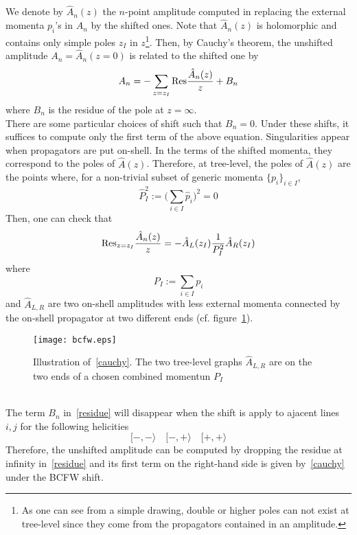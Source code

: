 \\\\
We denote by $\hat{A}_n(z)$ the $n$-point amplitude computed in replacing the external momenta $p_i$'s in $A_n$ by the shifted ones. 
Note that $\hat{A}_n(z)$ is holomorphic and contains only simple poles $z_I$ in $z$\footnote{As one can see from a simple drawing, double or higher poles can not exist at tree-level since they come from the propagators contained in an amplitude.}.
Then, by Cauchy's theorem, the unshifted amplitude $A_n = \hat{A}_n(z=0)$ is related to the shifted one by
\begin{equation}\label{residue}
A_n = - \sum_{z = z_I}\mathrm{Res}\frac{\hat{A}_n(z)}{z} + B_n
\end{equation} 
where $B_n$ is the residue of the pole at $z = \infty$.
\\
There are some particular choices of shift such that $B_n = 0$.
Under these shifts, it suffices to compute only the first term of the above equation. 
Singularities appear when propagators are put on-shell. 
In the terms of the shifted momenta, they correspond to the poles of $\hat{A}(z)$.
Therefore, at tree-level, the poles of $\hat{A}(z)$ are the points where, for a non-trivial subset of generic momenta $\{p_i\}_{i\in I}$, 
\begin{equation}
\hat{P}_I^2 := \big( \sum_{i\in I} \hat{p}_i \big)^2 = 0
\end{equation}   
%
Then, one can check that
\begin{equation}\label{cauchy}
\mathrm{Res}_{z=z_I}\frac{\hat{A}_n(z)}{z} = - \hat{A}_L(z_I)\frac{1}{P_I^2}\hat{A}_R(z_I)
\end{equation}
where 
\begin{equation}
P_I := \sum_{i\in I}p_i
\end{equation}
and $\hat{A}_{L,R}$ are two on-shell amplitudes with less external momenta connected by the on-shell propagator at two different ends (cf. figure~\ref{fig_cauchy}).
\begin{figure}[h]
  \centering
  \texttt{[image: bcfw.eps]}
  \caption{Illustration of~\cref{cauchy}. The two tree-level graphs $\hat{A}_{L,R}$ are on the two ends of a chosen combined momentun $P_I$}
  \label{fig_cauchy}
\end{figure}
\\
The term $B_n$ in~\cref{residue} will disappear when the shift is apply to ajacent lines $i,j$ for the following helicities~\cite{ArkaniHamed:2008yf}
\begin{equation}
[-,-\rangle \quad [-,+\rangle \quad [+,+\rangle
\end{equation}
Therefore, the unshifted amplitude can be computed by dropping the residue at infinity in~\cref{residue} and its first term on the right-hand side is given by~\cref{cauchy} under the BCFW shift.
%
